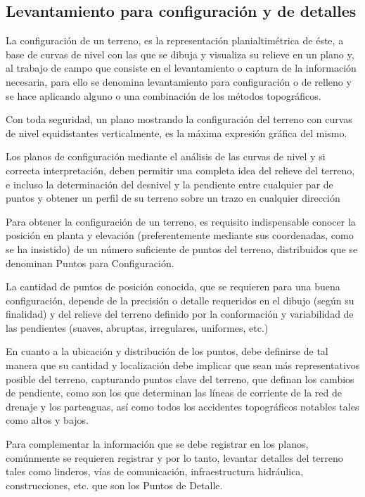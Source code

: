 \subsection{Levantamiento para configuración y de detalles}

La configuración de un terreno, es la representación planialtimétrica de éste, a base de curvas de nivel con las que se dibuja y visualiza su relieve en un plano y, al trabajo de campo que consiste en el  levantamiento o captura de la información necesaria, para ello se denomina levantamiento para configuración o de relleno y se hace aplicando alguno o una combinación de los métodos topográficos.

Con toda seguridad, un plano mostrando la configuración del terreno con curvas de nivel equidistantes verticalmente, es la máxima expresión gráfica del mismo.

Los planos de configuración mediante el análisis de las curvas de nivel y si correcta interpretación, deben permitir una completa idea del relieve del terreno, e incluso la determinación del desnivel y la pendiente entre cualquier par de puntos y obtener un perfil de su terreno sobre un trazo en cualquier dirección

Para obtener la configuración de un terreno, es requisito indispensable conocer la posición en planta y elevación (preferentemente mediante sus coordenadas, como se ha insistido) de un número suficiente de puntos del terreno, distribuidos que se denominan Puntos para Configuración.

La cantidad de puntos de posición conocida, que se requieren para una buena configuración, depende de la precisión o detalle requeridos en el dibujo (según su finalidad) y del relieve del terreno definido por la conformación y variabilidad de las pendientes (suaves, abruptas, irregulares, uniformes, etc.)

En cuanto a la ubicación y distribución de los puntos, debe definirse de tal manera que su cantidad y localización debe implicar que sean más representativos posible del terreno, capturando puntos clave del terreno, que definan los cambios de pendiente, como son los que determinan las líneas de corriente de la red de drenaje y los parteaguas, así como todos los accidentes topográficos notables tales como altos y bajos.

Para complementar la información que se debe registrar en los planos, comúnmente se requieren registrar y por lo tanto, levantar detalles del terreno tales como linderos, vías de comunicación, infraestructura hidráulica, construcciones, etc. que son los Puntos de Detalle.


